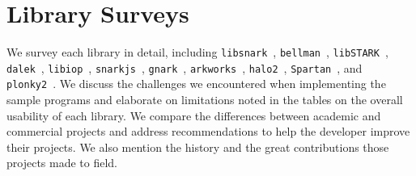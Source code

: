 \documentclass[letterpaper,twocolumn,10pt]{article}
\theoremstyle{definition}
\newcommand{\zk}{\text{zk-SNARK}\xspace}
\newcommand{\lib}[1]{\texttt{#1}\xspace}
\newenvironment{takeaway}[1][]
  {
 \begin{tcolorbox}
 [%
    enhanced, 
    breakable,
    boxrule=0.5pt,
    arc=4pt,
    left=2pt,
    right=2pt,
    bottom=2pt,
    top=2pt,
    rounded corners
    ]{}
  \textbf{#1.}
  \small \itshape}
  {
\end{tcolorbox}
}
\begin{document}
\section{Library Surveys}
\label{sec:applib}
We survey each library in detail, including \lib{libsnark}~\cite{libsnark}, 
\lib{bellman}~\cite{bellman}, 
\lib{libSTARK}~\cite{libsTark},
\lib{dalek}~\cite{dalek-bulletproofs},
\lib{libiop}~\cite{libiop}, \lib{snarkjs}~\cite{snarkjs}, \lib{gnark}~\cite{gnark}, 
\lib{arkworks}~\cite{arkworks},
\lib{halo2}~\cite{halo2}, 
\lib{Spartan}~\cite{spartan}, 
and \lib{plonky2}~\cite{plonky2}. We discuss the challenges we encountered when implementing the sample programs and elaborate on limitations noted in the tables on the overall usability of each library. We compare the differences between academic and commercial projects and address recommendations to help the developer improve their projects. We also mention the history and the great contributions those projects made to \zk field. 




		
\end{document}
